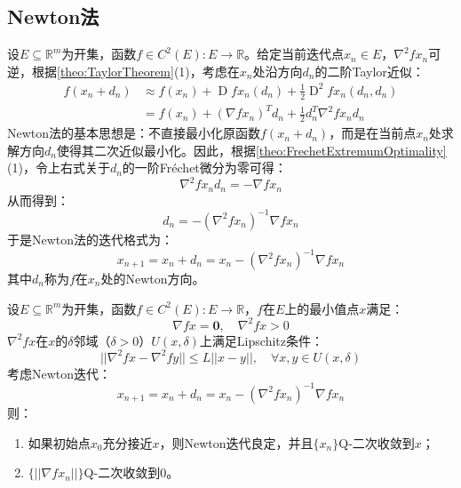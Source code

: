 \subsection{Newton法}
\begin{method}\label{method:NewtonMethod}
	设$E\subseteq \mathbb{R}^m$为开集，函数$f\in C^2(E):E\to\mathbb{R}$。给定当前迭代点$x_n\in E$，$\nabla^2fx_n$可逆，根据\cref{theo:TaylorTheorem}(1)，考虑在$x_n$处沿方向$d_n$的二阶Taylor近似：
	\begin{align*}
		f(x_n+d_n)&\approx f(x_n)+\operatorname{D}fx_n(d_n)+\frac{1}{2}\operatorname{D}^2fx_n(d_n,d_n) \\
		&=f(x_n)+(\nabla fx_n)^Td_n+\frac{1}{2}d_n^T\nabla^2fx_nd_n
	\end{align*}
	Newton法的基本思想是：不直接最小化原函数$f(x_n+d_n)$，而是在当前点$x_n$处求解方向$d_n$使得其二次近似最小化。因此，根据\cref{theo:FrechetExtremumOptimality}(1)，令上右式关于$d_n$的一阶Fr\'echet微分为零可得：
	\begin{equation*}
		\nabla^2fx_nd_n=-\nabla fx_n
	\end{equation*}
	从而得到：
	\begin{equation*}
		d_n=-\left(\nabla^2fx_n\right)^{-1}\nabla fx_n
	\end{equation*}
	于是Newton法的迭代格式为：
	\begin{equation*}
		x_{n+1}=x_n+d_n=x_n-\left(\nabla^2fx_n\right)^{-1}\nabla fx_n
	\end{equation*}
	其中$d_n$称为$f$在$x_n$处的Newton方向。
\end{method}
\begin{theorem}\label{theo:ClassicalNewtonConvergence}
	设$E\subseteq \mathbb{R}^m$为开集，函数$f\in C^2(E):E\to\mathbb{R}$，$f$在$E$上的最小值点$x$满足：
	\begin{equation*}
		\nabla fx=\mathbf{0},\quad\nabla^2fx>0
	\end{equation*}
	$\nabla^2fx$在$x$的$\delta$邻域（$\delta>0$）$U(x,\delta)$上满足Lipschitz条件：
	\begin{equation*}
		||\nabla^2fx-\nabla^2fy||\leqslant L||x-y||,\quad\forall x,y\in U(x,\delta)
	\end{equation*}
	考虑Newton迭代：
	\begin{equation*}
		x_{n+1}=x_n+d_n=x_n-\left(\nabla^2fx_n\right)^{-1}\nabla fx_n
	\end{equation*}
	则：
	\begin{enumerate}
		\item 如果初始点$x_0$充分接近$x$，则Newton迭代良定，并且$\{x_n\}$Q-二次收敛到$x$；
		\item $\{||\nabla fx_n||\}$Q-二次收敛到$0$。
	\end{enumerate}
\end{theorem}
